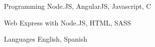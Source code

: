 

\begin{cvskills}

  \cvskill
    {Programming} %
    {Node.JS, AngularJS, Javascript, C} %

  \cvskill
    {Web} %
    {Express with Node.JS, HTML, SASS} %

  \cvskill
    {Languages} %
    {English, Spanish} %

\end{cvskills}
